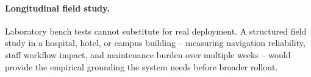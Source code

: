 \paragraph{Longitudinal field study.}
Laboratory bench tests cannot substitute for real deployment. A structured field study in a hospital, hotel, or campus building -- measuring navigation reliability, staff workflow impact, and maintenance burden over multiple weeks -- would provide the empirical grounding the system needs before broader rollout.
